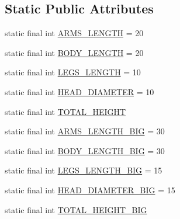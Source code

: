 \subsection*{Static Public Attributes}
\begin{DoxyCompactItemize}
\item 
static final int \hyperlink{classorg_1_1tzi_1_1use_1_1gui_1_1views_1_1diagrams_1_1behavior_1_1_drawing_util_ad7f914d441b32d335798aadce677790e}{A\-R\-M\-S\-\_\-\-L\-E\-N\-G\-T\-H} = 20
\item 
static final int \hyperlink{classorg_1_1tzi_1_1use_1_1gui_1_1views_1_1diagrams_1_1behavior_1_1_drawing_util_a54babfc34a291b15ff66c65af83c4717}{B\-O\-D\-Y\-\_\-\-L\-E\-N\-G\-T\-H} = 20
\item 
static final int \hyperlink{classorg_1_1tzi_1_1use_1_1gui_1_1views_1_1diagrams_1_1behavior_1_1_drawing_util_a4bd49379195ecd847e66b9a996a29cc9}{L\-E\-G\-S\-\_\-\-L\-E\-N\-G\-T\-H} = 10
\item 
static final int \hyperlink{classorg_1_1tzi_1_1use_1_1gui_1_1views_1_1diagrams_1_1behavior_1_1_drawing_util_afe28aef2f62f28414e744d463840ea34}{H\-E\-A\-D\-\_\-\-D\-I\-A\-M\-E\-T\-E\-R} = 10
\item 
static final int \hyperlink{classorg_1_1tzi_1_1use_1_1gui_1_1views_1_1diagrams_1_1behavior_1_1_drawing_util_aa90dd6884fc5da3ab4f3660fa08b9c3b}{T\-O\-T\-A\-L\-\_\-\-H\-E\-I\-G\-H\-T}
\item 
static final int \hyperlink{classorg_1_1tzi_1_1use_1_1gui_1_1views_1_1diagrams_1_1behavior_1_1_drawing_util_a7a14560b1d3cf4fe9ab278d3ebb14062}{A\-R\-M\-S\-\_\-\-L\-E\-N\-G\-T\-H\-\_\-\-B\-I\-G} = 30
\item 
static final int \hyperlink{classorg_1_1tzi_1_1use_1_1gui_1_1views_1_1diagrams_1_1behavior_1_1_drawing_util_a3367022a56cefd4b82efa24b52586fc0}{B\-O\-D\-Y\-\_\-\-L\-E\-N\-G\-T\-H\-\_\-\-B\-I\-G} = 30
\item 
static final int \hyperlink{classorg_1_1tzi_1_1use_1_1gui_1_1views_1_1diagrams_1_1behavior_1_1_drawing_util_a2775f422574ad3c37cb1ae254449ffaf}{L\-E\-G\-S\-\_\-\-L\-E\-N\-G\-T\-H\-\_\-\-B\-I\-G} = 15
\item 
static final int \hyperlink{classorg_1_1tzi_1_1use_1_1gui_1_1views_1_1diagrams_1_1behavior_1_1_drawing_util_a0a63e4308bf6684e43e397820ee3b3a1}{H\-E\-A\-D\-\_\-\-D\-I\-A\-M\-E\-T\-E\-R\-\_\-\-B\-I\-G} = 15
\item 
static final int \hyperlink{classorg_1_1tzi_1_1use_1_1gui_1_1views_1_1diagrams_1_1behavior_1_1_drawing_util_adce67daaab8246dc8f8ee1a84dbc734b}{T\-O\-T\-A\-L\-\_\-\-H\-E\-I\-G\-H\-T\-\_\-\-B\-I\-G}
\end{DoxyCompactItemize}


